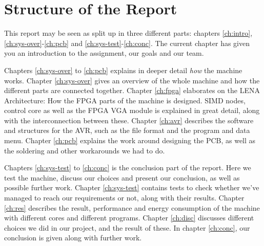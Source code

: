 \section{Structure of the Report}

This report may be seen as split up in three different parts: chapters
\ref{ch:intro}, \ref{ch:sys-over}-\ref{ch:pcb} and
\ref{ch:sys-test}-\ref{ch:conc}.  The
current chapter has given you an introduction to the assignment, our goals and
our team. 

Chapters \ref{ch:sys-over} to \ref{ch:pcb} explains in deeper detail {\em how}
the machine works. Chapter \ref{ch:sys-over} gives an overview of the whole
machine and how the different parts are connected together. Chapter
\ref{ch:fpga} elaborates on the \ac{LENA} Architecture: How the \ac{FPGA} parts
of the machine is designed. \ac{SIMD} nodes, control core as well as the
\ac{FPGA} \ac{VGA} module is explained in great detail, along with the
interconnection between these. Chapter \ref{ch:avr} describes the software and
structures for the AVR, such as the file format and the program and data
menu. Chapter \ref{ch:pcb} explains the work around designing the \ac{PCB}, as
well as the soldering and other workarounds we had to do.

Chapters \ref{ch:sys-test} to \ref{ch:conc} is the conclusion part of the
report. Here we test the machine, discuss our choices and present our
conclusion, as well as possible further work. Chapter \ref{ch:sys-test} contains
tests to check whether we've managed to reach our requirements or not, along
with their results. Chapter \ref{ch:res} describes the result, performance and
energy consumption of the machine with different cores and different
programs. Chapter \ref{ch:disc} discusses different choices we did in our
project, and the result of these. In chapter \ref{ch:conc}, our conclusion is
given along with further work.
